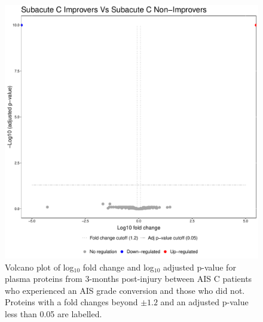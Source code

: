 \documentclass[9pt,lineno]{elife}
\begin{document}
\begin{figure}
\includegraphics[width=1\linewidth]{figures/openms_protein_quantification/label_free/volcano_plots/openms_volcano_plot_2021-08-10_0026} \caption{Volcano plot of log\(_10\) fold change and log\(_10\) adjusted p-value for plasma proteins from 3-months post-injury between AIS C patients who experienced an AIS grade conversion and those who did not. Proteins with a fold changes beyond \(\pm 1.2\) and an adjusted p-value less than 0.05 are labelled.}\label{fig:volc-plot-subacute-c-imp-vs-nonimp}
\end{figure}
\end{document}
